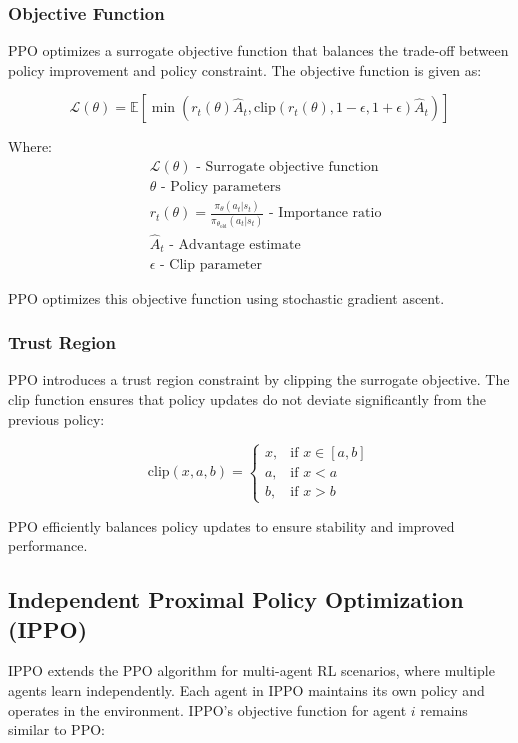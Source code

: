 \subsubsection{Objective Function}

PPO optimizes a surrogate objective function that balances the trade-off between policy improvement and policy constraint. The objective function is given as:

\[
\mathcal{L}(\theta) = \mathbb{E}\left[\min\left(r_t(\theta)\hat{A}_t, \text{clip}\left(r_t(\theta), 1-\epsilon, 1+\epsilon\right)\hat{A}_t\right)\right]
\]

Where:
\begin{align*}
    &\mathcal{L}(\theta) \text{ - Surrogate objective function}\\
    &\theta \text{ - Policy parameters}\\
    &r_t(\theta) = \frac{\pi_{\theta}(a_t|s_t)}{\pi_{\theta_{\text{old}}}(a_t|s_t)} \text{ - Importance ratio}\\
    &\hat{A}_t \text{ - Advantage estimate}\\
    &\epsilon \text{ - Clip parameter}
\end{align*}

PPO optimizes this objective function using stochastic gradient ascent.

\subsubsection{Trust Region}

PPO introduces a trust region constraint by clipping the surrogate objective. The clip function ensures that policy updates do not deviate significantly from the previous policy:

\[
\text{clip}(x, a, b) = \begin{cases}
    x, & \text{if } x \in [a, b]\\
    a, & \text{if } x < a\\
    b, & \text{if } x > b
\end{cases}
\]

PPO efficiently balances policy updates to ensure stability and improved performance.

\subsection{Independent Proximal Policy Optimization (IPPO)}

IPPO extends the PPO algorithm for multi-agent RL scenarios, where multiple agents learn independently. Each agent in IPPO maintains its own policy and operates in the environment. IPPO's objective function for agent \(i\) remains similar to PPO:

